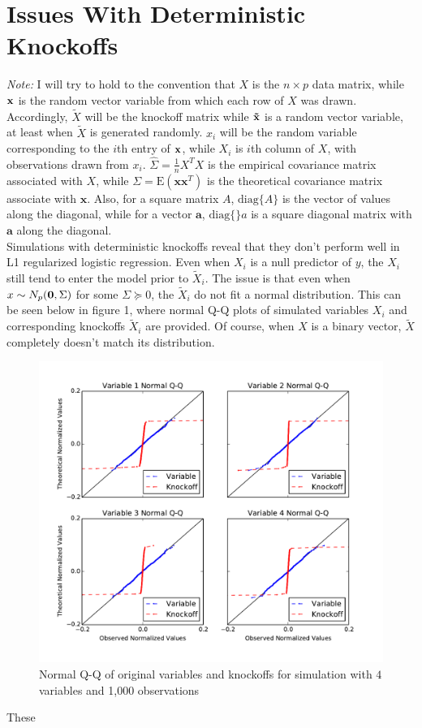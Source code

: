 \documentclass[11pt]{article}
\newcommand{\E}{\mathrm{E}}
\newcommand{\diag}[1]{\mathrm{diag}\{#1\}}
\theoremstyle{definition}
\begin{document}
\section{Issues With Deterministic Knockoffs} 
    {\em Note:} I will try to hold to the convention that $X$ is the $n\times p$ data matrix, while $\bf x$ is the random vector variable from which each row of $X$ was drawn. Accordingly, $\tilde X$ will be the knockoff matrix while $\bf \tilde x$ is a random vector variable, at least when $\tilde X$ is generated randomly. $x_i$ will be the random variable corresponding to the $i$th entry of $\bf x$, while $X_i$ is $i$th column of $X$, with observations drawn from $x_i$. $\hat \Sigma = \frac{1}{n}X^TX$ is the empirical covariance matrix associated with $X$, while $\Sigma=\E(\mathbf x \mathbf x^T)$ is the theoretical covariance matrix associate with $\mathbf x$. Also, for a square matrix $A$, $\diag A$ is the vector of values along the diagonal, while for a vector $\mathbf a$, $\diag \mathbf a$ is a square diagonal matrix with $\mathbf a$ along the diagonal.\\

    Simulations with deterministic knockoffs reveal that they don't perform well in L1 regularized logistic regression. Even when $X_i$ is a null predictor of $y$, the $X_i$ still tend to enter the model prior to $\tilde X_i$. The issue is that even when $x\sim N_p({\bf 0}, \Sigma)$ for some $\Sigma\succeq 0$, the $\tilde X_i$ do not fit a normal distribution. This can be seen below in figure 1, where normal Q-Q plots of simulated variables $X_i$ and corresponding knockoffs $\tilde X_i$ are provided. Of course, when $X$ is a binary vector, $\tilde X$ completely doesn't match its distribution.
    \begin{figure}[h!]
        \includegraphics[width=20cm]{images/normalQQ}
        \caption{Normal Q-Q of original variables and knockoffs for simulation with $4$ variables and 1,000 observations}
    \end{figure}
    These 
    
\end{document}
